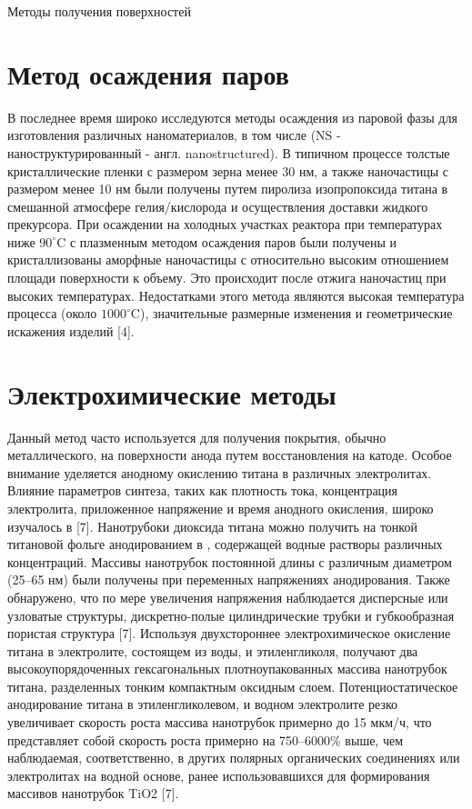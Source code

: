 \documentclass[oneside,final,12pt]{extreport}
\begin{document}
\begin{chapter} {Методы получения поверхностей }
\section{Метод осаждения паров}
В последнее время широко исследуются методы осаждения из паровой фазы для изготовления различных наноматериалов, в том числе  (NS - наноструктурированный - англ. nanostructured). В типичном процессе толстые кристаллические пленки  с размером зерна менее 30 нм, а также наночастицы  с размером менее 10 нм были получены путем пиролиза изопропоксида титана в смешанной атмосфере гелия/кислорода и осуществления доставки жидкого прекурсора. При осаждении на холодных участках реактора при температурах ниже $90^{\circ}$C с плазменным методом осаждения паров были получены и кристаллизованы аморфные наночастицы  с относительно высоким отношением площади поверхности к объему. Это происходит после отжига наночастиц при высоких температурах. Недостатками этого метода являются высокая температура процесса (около $1000^{\circ}$C), значительные размерные изменения и геометрические искажения изделий [4].

\section{Электрохимические методы}

Данный метод часто используется для получения покрытия, обычно металлического, на поверхности анода путем восстановления на катоде. Особое внимание уделяется анодному окислению титана в различных электролитах. Влияние параметров синтеза, таких как плотность тока, концентрация электролита, приложенное напряжение и время анодного окисления, широко изучалось в [7]. Нанотрубоки диоксида титана можно получить на тонкой титановой фольге анодированием в , содержащей водные растворы различных концентраций. Массивы нанотрубок постоянной длины с различным диаметром (25–65 нм) были получены при переменных напряжениях анодирования. Также обнаружено, что по мере увеличения напряжения наблюдается дисперсные или узловатые структуры, дискретно-полые цилиндрические трубки и губкообразная пористая структура [7]. Используя двухстороннее электрохимическое окисление титана в электролите, состоящем из воды,  и этиленгликоля, получают два высокоупорядоченных гексагональных плотноупакованных массива нанотрубок титана, разделенных тонким компактным оксидным слоем. Потенциостатическое анодирование титана в этиленгликолевом,  и водном электролите резко увеличивает скорость роста массива нанотрубок примерно до 15 мкм/ч, что представляет собой скорость роста примерно на 750–6000\% выше, чем наблюдаемая, соответственно, в других полярных органических соединениях или электролитах на водной основе, ранее использовавшихся для формирования массивов нанотрубок TiO2 [7].


\end{chapter}
\end{document}
